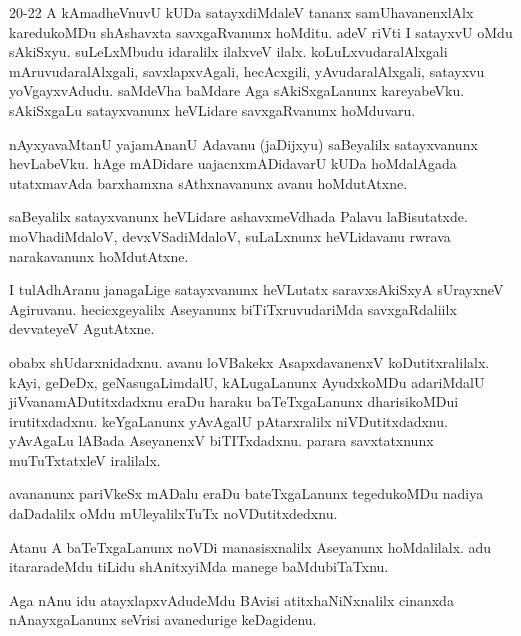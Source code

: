\documentclass{article}
\begin{document}
\begin{mng}20-22
A kAmadheVnuvU kUDa satayxdiMdaleV tananx samUhavanenxlAlx 
karedukoMDu shAshavxta savxgaRvanunx hoMditu. adeV riVti I satayxvU
oMdu sAkiSxyu. suLeLxMbudu idaralilx ilalxveV ilalx. koLuLxvudaralAlxgali
mAruvudaralAlxgali, savxlapxvAgali, hecAcxgili, yAvudaralAlxgali, satayxvu
yoVgayxvAdudu. saMdeVha baMdare Aga sAkiSxgaLanunx kareyabeVku. sAkiSxgaLu
satayxvanunx heVLidare savxgaRvanunx hoMduvaru.
\end{mng}

\begin{mng}%
nAyxyavaMtanU yajamAnanU Adavanu (jaDijxyu) saBeyalilx
satayxvanunx hevLabeVku. hAge mADidare uajacnxmADidavarU kUDa hoMdalAgada
utatxmavAda barxhamxna sAthxnavanunx avanu hoMdutAtxne.
\end{mng}

\begin{mng}%
saBeyalilx satayxvanunx heVLidare ashavxmeVdhada Palavu laBisutatxde.
moVhadiMdaloV, devxVSadiMdaloV, suLaLxnunx heVLidavanu rwrava narakavanunx
hoMdutAtxne.
\end{mng}

\begin{mng}%
I tulAdhAranu janagaLige satayxvanunx heVLutatx saravxsAkiSxyA
sUrayxneV Agiruvanu. hecicxgeyalilx Aseyanunx biTiTxruvudariMda savxgaRdaliilx devvateyeV AgutAtxne.
\end{mng}

\begin{mng}%
obabx shUdarxnidadxnu. avanu loVBakekx AsapxdavanenxV koDutitxralilalx. 
kAyi, geDeDx, geNasugaLimdalU, kALugaLanunx AyudxkoMDu
adariMdalU jiVvanamADutitxdadxnu eraDu haraku baTeTxgaLanunx dharisikoMDui
irutitxdadxnu. keYgaLanunx yAvAgalU pAtarxralilx niVDutitxdadxnu. yAvAgaLu
lABada AseyanenxV biTITxdadxnu. parara savxtatxnunx muTuTxtatxleV iralilalx.
\end{mng}

\begin{mng}%
avananunx pariVkeSx mADalu eraDu bateTxgaLanunx tegedukoMDu
nadiya daDadalilx oMdu mUleyalilxTuTx noVDutitxdedxnu.
\end{mng}

\begin{mng}%
Atanu A baTeTxgaLanunx noVDi manasisxnalilx Aseyanunx hoMdalilalx.
adu itararadeMdu tiLidu shAnitxyiMda manege baMdubiTaTxnu.
\end{mng}

\begin{mng}%
Aga nAnu idu atayxlapxvAdudeMdu BAvisi atitxhaNiNxnalilx
cinanxda nAnayxgaLanunx seVrisi avanedurige keDagidenu.
\end{mng}
\end{document}
